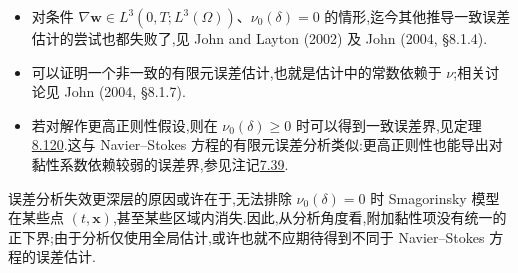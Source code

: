 \begin{note}[自然正则性下且 $\nu_0(\delta)=0$ 的情形]
\begin{itemize}
 \item 对条件
 $\nabla\bm{w}\in L^3(0,T;L^3(\Omega))$、$\nu_0(\delta)=0$ 的情形,迄今其他推导一致误差估计的尝试也都失败了,见 John and Layton (2002) 及 John (2004, §8.1.4).
 \item 可以证明一个非一致的有限元误差估计,也就是估计中的常数依赖于 $\nu$;相关讨论见 John (2004, §8.1.7).
 \item 若对解作更高正则性假设,则在 $\nu_0(\delta)\ge0$ 时可以得到一致误差界,见定理\hyperref[thm:smagorinsky-error-estimate-uniform]{8.120}.这与 Navier--Stokes 方程的有限元误差分析类似:更高正则性也能导出对黏性系数依赖较弱的误差界,参见注记\hyperref[note:time-dependent-fem-error-viscosity-regularity]{7.39}.
\end{itemize}
误差分析失效更深层的原因或许在于,无法排除 $\nu_0(\delta)=0$ 时
Smagorinsky 模型在某些点 $(t,\bm{x})$,甚至某些区域内消失.因此,从分析角度看,附加黏性项没有统一的正下界;由于分析仅使用全局估计,或许也就不应期待得到不同于 Navier--Stokes 方程的误差估计.
\end{note}

